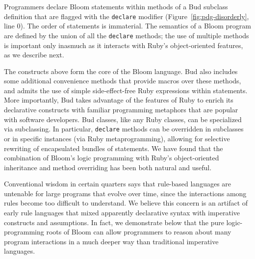 Programmers declare Bloom statements within methods of a Bud subclass definition that are flagged with the \texttt{declare} modifier (Figure~\ref{fig:pdg-disorderly}, line 0).  The order of statements is immaterial.  The semantics of a Bloom program are defined by the union of all the \texttt{declare} methods; the use of multiple methods is important only inasmuch as it interacts with Ruby's object-oriented features, as we describe next.

The constructs above form the core of the Bloom language.
Bud also includes some additional convenience methods that provide macros over these methods, and admits the use of simple side-effect-free Ruby expressions within statements.  More importantly, Bud takes advantage of the features of Ruby to enrich its declarative constructs with familiar programming metaphors that are popular with software developers.  Bud classes, like any Ruby classes, can be specialized via subclassing.  In particular, \texttt{declare} methods can be overridden in subclasses or in specific instances (via Ruby metaprogramming), allowing for selective rewriting of encapsulated bundles of statements.  We have found that the combination of Bloom's logic programming with Ruby's object-oriented inheritance and method overriding has been both natural and useful.

Conventional wisdom in certain quarters says that rule-based languages are untenable for large programs that evolve over time, since the interactions among rules become too difficult to understand.  We believe this concern is an artifact of early rule languages that mixed apparently declarative syntax with imperative constructs and assumptions.  In fact, we demonstrate below that the pure logic-programming roots of Bloom can allow programmers to reason about many program interactions in a much deeper way than traditional imperative languages.

